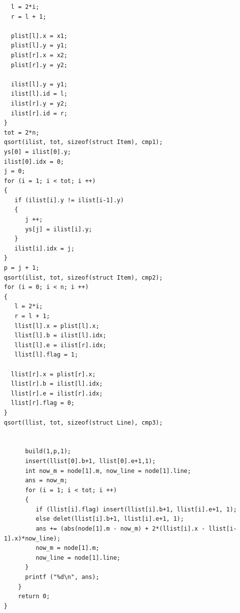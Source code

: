 \documentclass[11pt]{article}
\begin{document}
\begin{verbatim}
  l = 2*i;
  r = l + 1;

  plist[l].x = x1;
  plist[l].y = y1;
  plist[r].x = x2;
  plist[r].y = y2;

  ilist[l].y = y1;
  ilist[l].id = l;
  ilist[r].y = y2;
  ilist[r].id = r;
}
tot = 2*n;
qsort(ilist, tot, sizeof(struct Item), cmp1);
ys[0] = ilist[0].y;
ilist[0].idx = 0;
j = 0;
for (i = 1; i < tot; i ++)
{
   if (ilist[i].y != ilist[i-1].y)
   {
      j ++;
      ys[j] = ilist[i].y;
   }
   ilist[i].idx = j;
}
p = j + 1;
qsort(ilist, tot, sizeof(struct Item), cmp2);
for (i = 0; i < n; i ++)
{
   l = 2*i;
   r = l + 1;
   llist[l].x = plist[l].x;
   llist[l].b = ilist[l].idx;
   llist[l].e = ilist[r].idx;
   llist[l].flag = 1;

  llist[r].x = plist[r].x;
  llist[r].b = ilist[l].idx;
  llist[r].e = ilist[r].idx;
  llist[r].flag = 0;
}
qsort(llist, tot, sizeof(struct Line), cmp3);


      build(1,p,1);
      insert(llist[0].b+1, llist[0].e+1,1);
      int now_m = node[1].m, now_line = node[1].line;
      ans = now_m;
      for (i = 1; i < tot; i ++)
      {
         if (llist[i].flag) insert(llist[i].b+1, llist[i].e+1, 1);
         else delet(llist[i].b+1, llist[i].e+1, 1);
         ans += (abs(node[1].m - now_m) + 2*(llist[i].x - llist[i-1].x)*now_line);
         now_m = node[1].m;
         now_line = node[1].line;
      }
      printf ("%d\n", ans);
    }
    return 0;
}



\end{verbatim}
\endgroup
\end{document}
